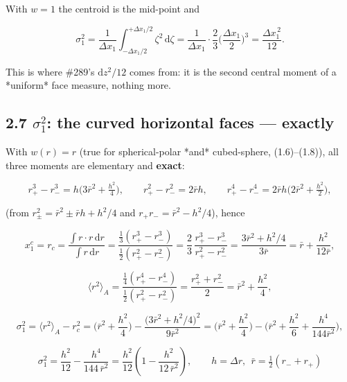 \documentclass[11pt,a4paper]{article}
\begin{document}
With $w=1$ the centroid is the mid-point and

\begin{equation*}
\sigma_1^2 = \frac{1}{\Delta x_1}\int_{-\Delta x_1/2}^{+\Delta x_1/2}\zeta^2\,\mathrm{d}\zeta
= \frac{1}{\Delta x_1}\cdot\frac{2}{3}\Big(\frac{\Delta x_1}{2}\Big)^3
= \frac{\Delta x_1^{\,2}}{12}.
\tag{2.11}
\end{equation*}

This is where \#289's $\mathrm{d}z^2/12$ comes from: it is the second central
moment of a *uniform* face measure, nothing more.

\subsection*{2.7 $\sigma_1^2$: the curved horizontal faces — exactly}

With $w(r)=r$ (true for spherical-polar *and* cubed-sphere, (1.6)–(1.8)), all
three moments are elementary and \textbf{exact}:

\begin{equation*}
r_+^3-r_-^3 = h\big(3\bar r^2+\tfrac{h^2}{4}\big),\qquad
r_+^2-r_-^2 = 2\bar r h,\qquad
r_+^4-r_-^4 = 2\bar r h\big(2\bar r^2+\tfrac{h^2}{2}\big),
\end{equation*}

(from $r_\pm^2=\bar r^2\pm\bar r h+h^2/4$ and $r_+r_-=\bar r^2-h^2/4$), hence

\begin{equation*}
x_1^c = r_c = \frac{\int r\cdot r\,\mathrm{d}r}{\int r\,\mathrm{d}r}
= \frac{\tfrac13(r_+^3-r_-^3)}{\tfrac12(r_+^2-r_-^2)}
= \frac{2}{3}\,\frac{r_+^3-r_-^3}{r_+^2-r_-^2}
= \frac{3\bar r^2+h^2/4}{3\bar r}
= \bar r + \frac{h^2}{12\bar r},
\tag{2.12}
\end{equation*}

\begin{equation*}
\langle r^2\rangle_A = \frac{\tfrac14(r_+^4-r_-^4)}{\tfrac12(r_+^2-r_-^2)}
= \frac{r_+^2+r_-^2}{2} = \bar r^2+\frac{h^2}{4},
\tag{2.13}
\end{equation*}

\begin{equation*}
\sigma_1^2 = \langle r^2\rangle_A - r_c^2
= \Big(\bar r^2+\frac{h^2}{4}\Big)
- \frac{\big(3\bar r^2+h^2/4\big)^2}{9\bar r^2}
= \Big(\bar r^2+\frac{h^2}{4}\Big)
- \Big(\bar r^2+\frac{h^2}{6}+\frac{h^4}{144\bar r^2}\Big),
\end{equation*}

\begin{equation*}
\boxed{\;
\sigma_1^2 = \frac{h^2}{12} - \frac{h^4}{144\,\bar r^2}
= \frac{h^2}{12}\left(1-\frac{h^2}{12\,\bar r^2}\right),
\qquad h=\Delta r,\ \ \bar r=\tfrac12(r_-+r_+)
\;}
\tag{2.14}
\end{equation*}
\end{document}

